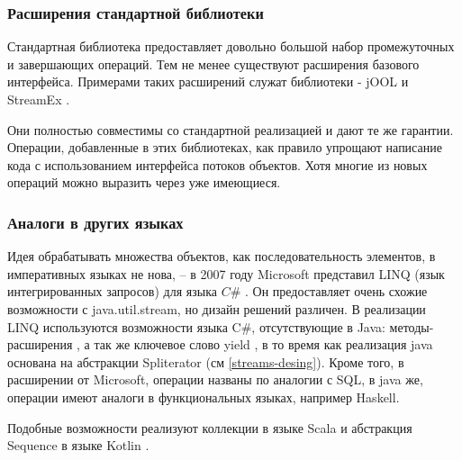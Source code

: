 \subsubsection{Расширения стандартной библиотеки}
Стандартная библиотека предоставляет довольно большой набор промежуточных и завершающих операций. Тем не менее существуют расширения базового интерфейса. Примерами таких расширений служат библиотеки - jOOL \cite{java:jool} и StreamEx \cite{java:streamex}.

Они полностью совместимы со стандартной реализацией и дают те же гарантии. Операции, добавленные в этих библиотеках, как правило упрощают написание кода с использованием интерфейса потоков объектов. Хотя многие из новых операций можно выразить через уже имеющиеся.

\subsubsection{Аналоги в других языках}
Идея обрабатывать множества объектов, как последовательность элементов, в императивных языках не нова, -- в 2007 году Microsoft представил LINQ (язык интегрированных запросов) для языка $C\#$ \cite{ms:linq}. Он предоставляет очень схожие возможности с java.util.stream, но дизайн решений различен. В реализации LINQ используются возможности языка C\#, отсутствующие в Java: методы-расширения \cite{ms:ext}, а так же ключевое слово yield \cite{ms:yield}, в то время как реализация java основана на абстракции Spliterator (см \ref{streams-desing}). Кроме того, в расширении от Microsoft, операции названы по аналогии с SQL, в java же, операции имеют аналоги в функциональных языках, например Haskell.

Подобные возможности реализуют коллекции в языке Scala \cite{ho:scala} и абстракция Sequence в языке Kotlin \cite{ho:kotlin}.
